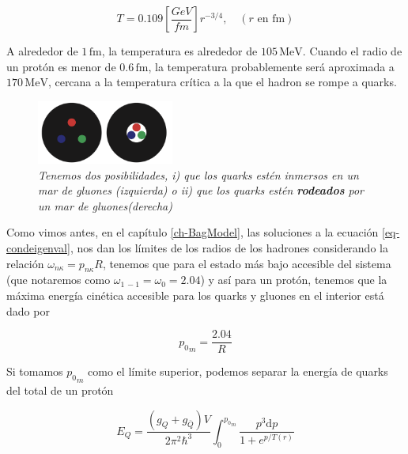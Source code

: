 \begin{equation}\label{eq-T(r)}
T = 0.109\left[ \frac{GeV}{fm}\right] {r}^{-3/4}, \quad (r  \text{ en fm})
\end{equation}

A alrededor de $1 \, \mathrm{fm}$, la temperatura es alrededor de $105 \, \mathrm{MeV}$. Cuando el radio de un protón es menor de $0.6 \, \mathrm{fm}$, la temperatura probablemente será aproximada a $170 \, \mathrm{MeV}$, cercana a la temperatura crítica a la que el hadron se rompe a quarks.

\begin{figure}
\centering
\includegraphics[width=0.4\textwidth]{./Images/Bag model-two scenaries.png}
\caption[Posibles estructuras del modelo de bolsa]{\emph{Tenemos dos posibilidades, i) que los quarks estén inmersos en un mar de gluones (izquierda) o ii) que los quarks estén \textbf{rodeados} por un mar de gluones(derecha)}}
\label{fig: 2Bag-models}
\end{figure}


Como vimos antes, en el capítulo \ref{ch-BagModel}, las soluciones a la ecuación \eqref{eq-condeigenval}, nos dan los límites de los radios de los hadrones considerando la relación ${\omega}_{n\kappa} = {p}_{n\kappa}{R}$, tenemos que para el estado más bajo accesible del sistema (que notaremos como ${\omega}_{1 \, -1} = {\omega}_{0} = 2.04$) y así para un protón, tenemos que la máxima energía cinética accesible para los quarks y gluones en el interior está dado por

\begin{equation}\label{eq-maxp}
{{p}_{0}}_{m} = \frac{2.04}{R}
\end{equation}

Si tomamos ${{p}_{0}}_{m}$ como el límite superior, podemos separar la energía de quarks del total de un protón

\begin{equation}
{E}_{Q} = \frac{\left({g}_{Q} + {g}_{\bar{Q}} \right) V}{2{\pi}^{2}{\hbar}^{3}} \int_{0}^{{{p}_{0}}_{m}} \frac{{p}^{3} \mathrm{d}p}{1 + {e}^{p/T(r)}}
\end{equation}

